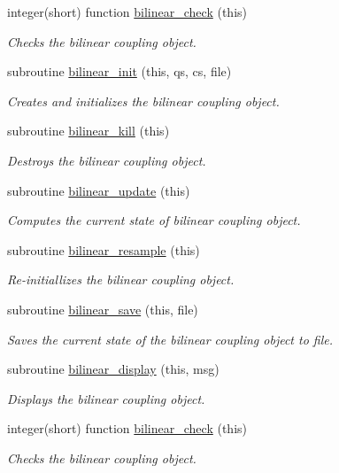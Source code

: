 \begin{DoxyCompactItemize}
integer(short) function \hyperlink{classbilinear__class_ab2484d90163983597fb17b15e480e675}{bilinear\+\_\+check} (this)
\begin{DoxyCompactList}\small\item\em Checks the bilinear coupling object. \end{DoxyCompactList}\item 
subroutine \hyperlink{classbilinear__class_a767f35cd3ebd5ef00f6a55fd775c3a27}{bilinear\+\_\+init} (this, qs, cs, file)
\begin{DoxyCompactList}\small\item\em Creates and initializes the bilinear coupling object. \end{DoxyCompactList}\item 
subroutine \hyperlink{classbilinear__class_ae206ab58d224c9a0b7e25ac038e003ae}{bilinear\+\_\+kill} (this)
\begin{DoxyCompactList}\small\item\em Destroys the bilinear coupling object. \end{DoxyCompactList}\item 
subroutine \hyperlink{classbilinear__class_a37ead815723c4c247c156200f5bf4721}{bilinear\+\_\+update} (this)
\begin{DoxyCompactList}\small\item\em Computes the current state of bilinear coupling object. \end{DoxyCompactList}\item 
subroutine \hyperlink{classbilinear__class_aac587f5ea6d66ee89ff3210b10569777}{bilinear\+\_\+resample} (this)
\begin{DoxyCompactList}\small\item\em Re-\/initiallizes the bilinear coupling object. \end{DoxyCompactList}\item 
subroutine \hyperlink{classbilinear__class_a5fe875f5d4db31ef7a7e721ba4a0146a}{bilinear\+\_\+save} (this, file)
\begin{DoxyCompactList}\small\item\em Saves the current state of the bilinear coupling object to file. \end{DoxyCompactList}\item 
subroutine \hyperlink{classbilinear__class_a4346246df7738e0d609716d961a3b94c}{bilinear\+\_\+display} (this, msg)
\begin{DoxyCompactList}\small\item\em Displays the bilinear coupling object. \end{DoxyCompactList}\item 
integer(short) function \hyperlink{classbilinear__class_ab2484d90163983597fb17b15e480e675}{bilinear\+\_\+check} (this)
\begin{DoxyCompactList}\small\item\em Checks the bilinear coupling object. \end{DoxyCompactList}\end{DoxyCompactItemize}


